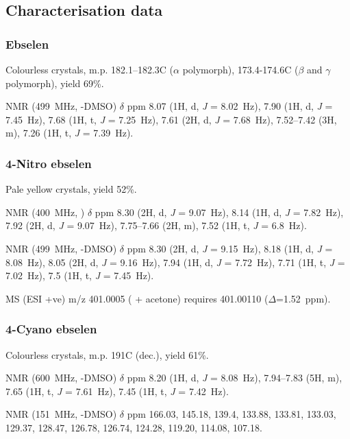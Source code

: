 \begin{refsection}
\subsection{Characterisation data}

\subsubsection{Ebselen }
Colourless crystals, m.p. 182.1--182.3\degree C ($\alpha$ polymorph), 173.4-174.6\degree C ($\beta$ and $\gamma$ polymorph), yield 69\%.

 NMR (499~MHz, -DMSO) $\delta$ ppm 8.07 (1H, d, \emph{J} = 8.02~Hz), 7.90 (1H, d, \emph{J} = 7.45~Hz), 7.68 (1H, t, \emph{J} = 7.25~Hz), 7.61 (2H, d, \emph{J} = 7.68~Hz), 7.52--7.42 (3H, m), 7.26 (1H, t, \emph{J} = 7.39~Hz).

\subsubsection{4-Nitro ebselen }
Pale yellow crystals, yield 52\%.

 NMR (400~MHz, ) $\delta$ ppm 8.30 (2H, d, \emph{J} = 9.07~Hz), 8.14 (1H, d, \emph{J} = 7.82~Hz), 7.92 (2H, d, \emph{J} = 9.07~Hz), 7.75--7.66 (2H, m), 7.52 (1H, t, \emph{J} = 6.8~Hz).

 NMR (499~MHz, -DMSO) $\delta$ ppm 8.30 (2H, d, \emph{J} = 9.15~Hz), 8.18 (1H, d, \emph{J} = 8.08~Hz), 8.05 (2H, d, \emph{J} = 9.16~Hz), 7.94 (1H, d, \emph{J} = 7.72~Hz), 7.71 (1H, t, \emph{J} = 7.02~Hz), 7.5 (1H, t, \emph{J} = 7.45~Hz).

MS (ESI +ve) m/z 401.0005 ( + acetone)  requires 401.00110 ($\Delta$=1.52~ppm).

\subsubsection{4-Cyano ebselen }
Colourless crystals, m.p. 191\degree C (dec.), yield 61\%.

 NMR (600~MHz, -DMSO) $\delta$ ppm 8.20 (1H, d, \emph{J} = 8.08~Hz), 7.94--7.83 (5H, m), 7.65 (1H, t, \emph{J} = 7.61~Hz), 7.45 (1H, t, \emph{J} = 7.42~Hz).

 NMR (151~MHz, -DMSO) $\delta$ ppm 166.03, 145.18, 139.4, 133.88, 133.81, 133.03, 129.37, 128.47, 126.78, 126.74, 124.28, 119.20, 114.08, 107.18.


\end{refsection}
